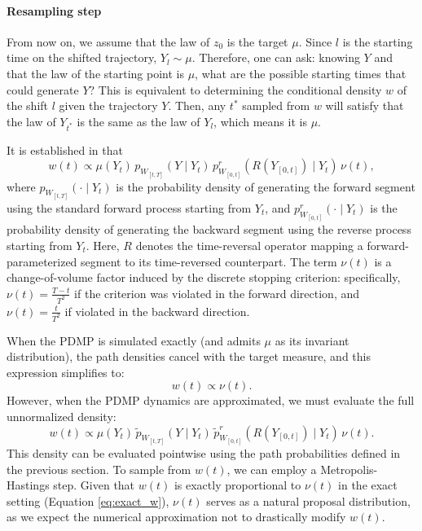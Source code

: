 \documentclass{article}
\begin{document}
\paragraph{Resampling step}
From now on, we assume that the law of $z_0$ is the target $\mu$. Since $l$ is the starting time on the shifted trajectory, $Y_l \sim \mu$. Therefore, one can ask: knowing $Y$ and that the law of the starting point is $\mu$, what are the possible starting times that could generate $Y$? This is equivalent to determining the conditional density $w$ of the shift $l$ given the trajectory $Y$. Then, any $t^*$ sampled from $w$ will satisfy that the law of $Y_{t^*}$ is the same as the law of $Y_l$, which means it is $\mu$. 

It is established in \cite{chevallier2025practicalpdmpsamplingmetropolis} that
\begin{equation}
    w(t) \propto \mu(Y_t) \, p_{W_{[t,T]}}(Y \mid Y_t) \, p^r_{W_{[0,t]}}(R(Y_{[0,t]}) \mid Y_t) \, \nu(t),
\end{equation}
where $p_{W_{[t,T]}}(\cdot \mid Y_t)$ is the probability density of generating the forward segment using the standard forward process starting from $Y_t$, and $p^r_{W_{[0,t]}}(\cdot \mid Y_t)$ is the probability density of generating the backward segment using the reverse process starting from $Y_t$. Here, $R$ denotes the time-reversal operator mapping a forward-parameterized segment to its time-reversed counterpart. The term $\nu(t)$ is a change-of-volume factor induced by the discrete stopping criterion: specifically, $\nu(t) = \frac{T-t}{T^2}$ if the criterion was violated in the forward direction, and $\nu(t) = \frac{t}{T^2}$ if violated in the backward direction.

When the PDMP is simulated exactly (and admits $\mu$ as its invariant distribution), the path densities cancel with the target measure, and this expression simplifies to:
\begin{equation}
    \label{eq:exact_w}
    w(t) \propto \nu(t).
\end{equation}
%
However, when the PDMP dynamics are approximated, we must evaluate the full unnormalized density:
\begin{equation}
    w(t) \propto \mu(Y_t) \, \tilde{p}_{W_{[t,T]}}(Y \mid Y_t) \, \tilde{p}^r_{W_{[0,t]}}(R(Y_{[0,t]}) \mid Y_t) \, \nu(t).
\end{equation}
This density can be evaluated pointwise using the path probabilities defined in the previous section. To sample from $w(t)$, we can employ a Metropolis-Hastings step. Given that $w(t)$ is exactly proportional to $\nu(t)$ in the exact setting (Equation \ref{eq:exact_w}), $\nu(t)$ serves as a natural proposal distribution, as we expect the numerical approximation not to drastically modify $w(t)$.
\end{document}
